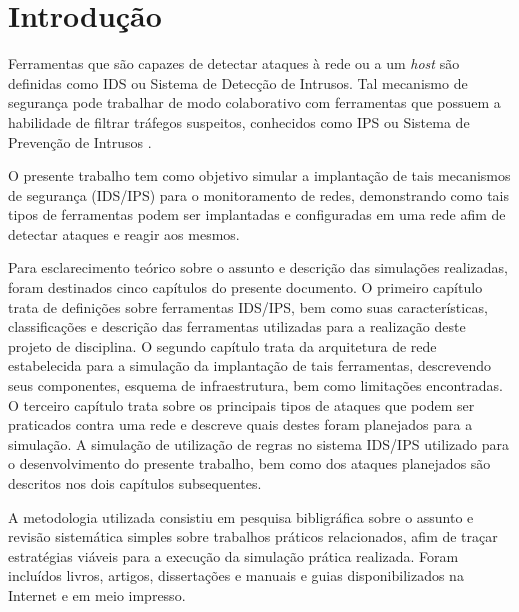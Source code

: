 \chapter[Introdução]{Introdução}
\label{chap:introducao}
	
		Ferramentas que são capazes de detectar ataques à rede ou a um \textit{host} são definidas como IDS ou Sistema de Detecção de Intrusos. Tal mecanismo de segurança pode trabalhar de modo colaborativo com ferramentas que possuem a habilidade de filtrar tráfegos suspeitos, conhecidos como IPS  ou Sistema de Prevenção de Intrusos \cite{Kurose}.
		
		O presente trabalho tem como objetivo simular a implantação de tais mecanismos de segurança (IDS/IPS) para o monitoramento de redes, demonstrando como tais tipos de ferramentas podem ser implantadas  e configuradas em uma rede afim de detectar ataques e reagir aos mesmos.
		
		Para esclarecimento teórico sobre o assunto e descrição das simulações realizadas, foram destinados cinco capítulos do presente documento. O primeiro capítulo trata de definições sobre ferramentas IDS/IPS, bem como suas características, classificações e descrição das ferramentas utilizadas para a realização deste projeto de disciplina. O segundo capítulo trata da arquitetura de rede estabelecida para a simulação da implantação de tais ferramentas, descrevendo seus componentes, esquema de infraestrutura, bem como limitações encontradas. O terceiro capítulo trata sobre os principais tipos de ataques que podem ser praticados contra uma rede e descreve quais destes foram planejados para a simulação. A simulação de utilização de regras no sistema IDS/IPS utilizado para o desenvolvimento do presente trabalho, bem como dos ataques planejados são descritos nos dois capítulos subsequentes.
		
		A metodologia utilizada consistiu em pesquisa bibligráfica sobre o assunto e revisão sistemática simples sobre trabalhos práticos relacionados, afim de traçar estratégias viáveis para a execução da simulação prática realizada. Foram incluídos livros, artigos, dissertações e manuais e guias disponibilizados na Internet e em meio impresso.

		
